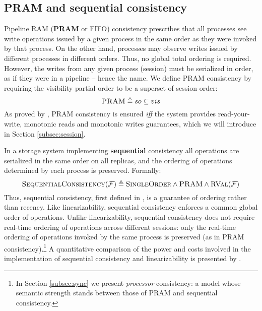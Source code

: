 \documentclass[letter, 11pt]{article}
\newcommand{\RVAL}{\textsc{RVal}(\mathcal{F})}
\newcommand{\citeN}{\citet}
\renewcommand{\cite}{\citep}
\begin{document}
\subsection{PRAM and sequential consistency}
\label{subsec:pram-seq}
Pipeline RAM (\textbf{PRAM} or FIFO) consistency  \cite{Lipton.Sandberg:88} prescribes that
all processes see write operations issued by a given process in the same order as they were invoked by that process.
On the other hand, processes may observe writes issued by different processes in different orders. 
Thus, no global total ordering is required. 
However, the writes from any given process (session) must be serialized in order, 
as if they were in a pipeline -- hence the name. 
We define PRAM consistency by requiring the visibility partial order to be a superset of session order: 
\begin{equation}
\textsc{PRAM} \triangleq so \subseteq vis
\end{equation}
As proved by \citeN{Brzezinski.Sobaniec.ea:03}, PRAM consistency is ensured \emph{iff} 
the system provides read-your-write, monotonic reads and monotonic writes guarantees,
which we will introduce in Section \ref{subsec:session}.



In a storage system implementing \textbf{sequential} consistency all operations are serialized 
in the same order on all replicas, and the ordering of operations determined by each process is preserved.
Formally:
\begin{equation}
\textsc{SequentialConsistency}(\mathcal{F}) \triangleq \textsc{SingleOrder} \wedge \textsc{PRAM} \wedge \RVAL
\end{equation}
Thus, sequential consistency, first defined in \cite{Lamport:79}, is a guarantee of 
ordering rather than recency. Like linearizability, sequential consistency enforces a common global order of operations.
Unlike linearizability, sequential consistency 
does not require real-time ordering of operations across different sessions: only the real-time 
ordering of operations invoked by the same process is preserved 
(as in PRAM consistency).\footnote{In Section \ref{subsec:sync} we present \emph{processor} consistency: 
a model whose semantic strength stands between those of PRAM and sequential consistency.}
A quantitative comparison of the power and costs involved 
in the implementation of sequential consistency and linearizability is presented by \citeN{Attiya:Welch:94}.
\end{document}
